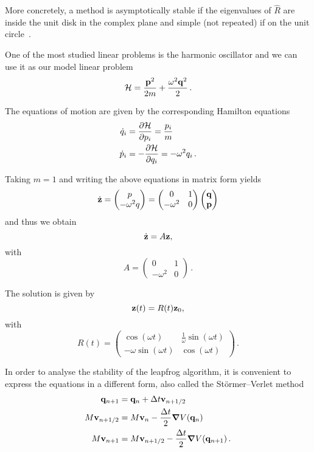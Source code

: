 \documentclass[12pt, class=report, crop=false]{standalone}
\begin{document}
More concretely, a method is asymptotically stable if the eigenvalues of
\(\hat{R}\) are inside the unit disk in the complex plane and simple (not repeated)
if on the unit circle~\autocite[28]{leimkuhler_simulatinghamiltonian_2004}.

One of the most studied linear problems is the harmonic oscillator and we can use
it as our model linear problem
\[
\mathcal{H} = \frac{\vb{p}^2}{2m} + \frac{\omega^2 \vb{q}^2}{2}\,.
\]

The equations of motion are given by the corresponding Hamilton equations
\begin{align*}
  \dot{q}_i &= \pdv{\mathcal{H}}{p_i} = \frac{p_i}{m} \\
  \dot{p}_i &= -\pdv{\mathcal{H}}{q_i} = -\omega^2 q_i\,.
\end{align*}

Taking \(m=1\) and writing the above equations in matrix form yields
\[
\dot{\vb{z}} =
\begin{pmatrix}
  p \\
  -\omega^2 q
\end{pmatrix} =
\begin{pmatrix}
  0 & 1 \\
  -\omega^2 & 0
\end{pmatrix}
\begin{pmatrix}
  \vb{q} \\
  \vb{p}
\end{pmatrix}
\]
and thus we obtain
\[
\dot{\vb{z}} = A \vb{z},
\]
with
\[
A =
\begin{pmatrix}
  0 & 1 \\
  -\omega^2 & 0
\end{pmatrix}\,.
\]

The solution is given by
\[
\vb{z}(t) = R(t) \vb{z}_0,
\]
with
\[
R(t) =
\begin{pmatrix}
  \cos(\omega t) & \frac{1}{\omega} \sin(\omega t) \\
  -\omega \sin(\omega t) & \cos(\omega t)
\end{pmatrix}\,.
\]

In order to analyse the stability of the leapfrog algorithm, it is convenient to
express the equations in a different form, also called the Störmer–Verlet method
\begin{align*}
  \vb{q}_{n+1} &= \vb{q}_n + \Delta t \vb{v}_{n+1/2} \\
  M \vb{v}_{n+1/2} &= M \vb{v}_n - \frac{\Delta t}{2} \grad{V(\vb{q}_n)} \\
  M \vb{v}_{n+1} &= M \vb{v}_{n+1/2} - \frac{\Delta t}{2} \grad{V(\vb{q}_{n+1})}\,.
\end{align*}
\end{document}
